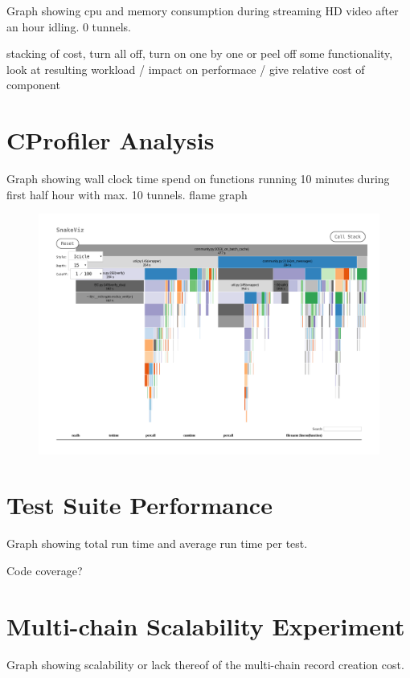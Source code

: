 Graph showing cpu and memory consumption during streaming HD video after an hour idling. 0 tunnels.



stacking of cost, turn all off, turn on one by one or peel off some functionality, look at resulting workload / impact on performace / give relative cost of component

\section{CProfiler Analysis}
Graph showing wall clock time spend on functions running 10 minutes during first half hour with max. 10 tunnels.
flame graph

\begin{figure}[h]
	\centering
	\includegraphics[width=\textwidth]{profile_1468515157}
	\caption{}
	\label{fig:profile_1468515157}
\end{figure}

\section{Test Suite Performance}
Graph showing total run time and average run time per test.

Code coverage?

\section{Multi-chain Scalability Experiment}
Graph showing scalability or lack thereof of the multi-chain record creation cost.

